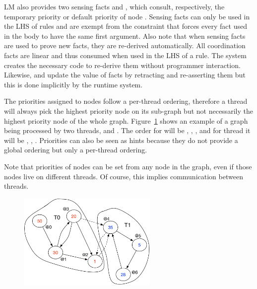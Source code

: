 LM also provides two sensing facts  and
, which consult, respectively, the
temporary priority or default priority  of node .  Sensing facts
can only be used in the LHS of rules and are exempt from the constraint that
forces every fact used in the body to have the same first argument. Also note
that when sensing facts are used to prove new facts, they are re-derived
automatically. All coordination facts are linear and thus consumed when used in
the LHS of a rule.  The system creates the necessary code to re-derive them
without programmer interaction. Likewise,  and
 update the value of  facts by
retracting and re-asserting them but this is done implicitly by the runtime
system.

The priorities assigned to nodes follow a per-thread ordering, therefore a
thread will always pick the highest priority node on its sub-graph but not
necessarily the highest priority node of the whole graph.
Figure~\ref{fig:coordination:priorities} shows an example of a graph being
processed by two threads,  and . The order for  will
be , , ,  and for thread  it will
be , , . Priorities can also be seen as hints because
they do not provide a global ordering but only a per-thread ordering.

Note that priorities of nodes can be set from any node in the graph, even if those nodes
live on different threads. Of course, this implies communication between
threads.

\begin{figure}
\begin{center}
   \includegraphics[width=0.6\textwidth]{figures/coordination/priorities.pdf}
\end{center}
\label{fig:coordination:priorities}
\end{figure}

